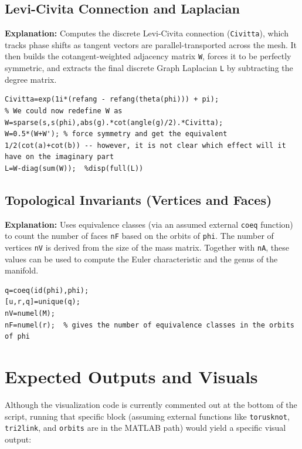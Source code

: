 \subsection{Levi-Civita Connection and Laplacian}
\textbf{Explanation:} Computes the discrete Levi-Civita connection (\texttt{Civitta}), which tracks phase shifts as tangent vectors are parallel-transported across the mesh. It then builds the cotangent-weighted adjacency matrix \texttt{W}, forces it to be perfectly symmetric, and extracts the final discrete Graph Laplacian \texttt{L} by subtracting the degree matrix.

\begin{lstlisting}[style=matlab]
% The connection:
Civitta=exp(1i*(refang - refang(theta(phi))) + pi);
% We could now redefine W as
W=sparse(s,s(phi),abs(g).*cot(angle(g)/2).*Civitta);
W=0.5*(W+W'); % force symmetry and get the equivalent 1/2(cot(a)+cot(b)) -- however, it is not clear which effect will it have on the imaginary part
L=W-diag(sum(W));  %disp(full(L))
\end{lstlisting}

\subsection{Topological Invariants (Vertices and Faces)}
\textbf{Explanation:} Uses equivalence classes (via an assumed external \texttt{coeq} function) to count the number of faces \texttt{nF} based on the orbits of \texttt{phi}. The number of vertices \texttt{nV} is derived from the size of the mass matrix. Together with \texttt{nA}, these values can be used to compute the Euler characteristic and the genus of the manifold.

\begin{lstlisting}[style=matlab]
q=coeq(id(phi),phi);
[u,r,q]=unique(q);
nV=numel(M);
nF=numel(r);  % gives the number of equivalence classes in the orbits of phi
\end{lstlisting}

\section{Expected Outputs and Visuals}

Although the visualization code is currently commented out at the bottom of the script, running that specific block (assuming external functions like \texttt{torusknot}, \texttt{tri2link}, and \texttt{orbits} are in the MATLAB path) would yield a specific visual output:

